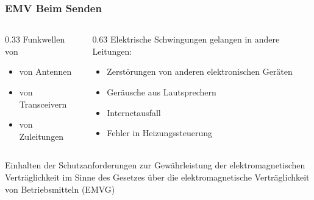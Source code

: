 \begin{frame}%
    \frametitle{EMV Beim Senden}
    \begin{columns}[T]
        \begin{column}{0.33\textwidth}
            Funkwellen von
            \begin{itemize}
                \item von Antennen
                \item von Transceivern
                \item von Zuleitungen
            \end{itemize}
        \end{column}
        \pause
        \begin{column}{0.63\textwidth}
            Elektrische Schwingungen gelangen in andere Leitungen:
            \begin{itemize}
                \item Zerstörungen von anderen elektronischen Geräten
                \item Geräusche aus Lautsprechern
                \item Internetausfall
                \item Fehler in Heizungssteuerung
            \end{itemize}
        \end{column}
    \end{columns}
    \pause

    \vspace{0.5cm}

    Einhalten der Schutzanforderungen zur Gewährleistung der elektromagnetischen Verträglichkeit im Sinne des Gesetzes über die elektromagnetische Verträglichkeit von Betriebsmitteln (EMVG)
\end{frame}

